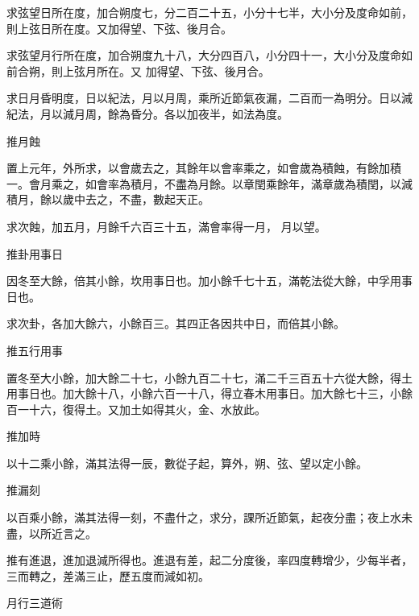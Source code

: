 \begin{pinyinscope}
 求弦望日所在度，加合朔度七，分二百二十五，小分十七半，大小分及度命如前，則上弦日所在度。又加得望、下弦、後月合。



 求弦望月行所在度，加合朔度九十八，大分四百八，小分四十一，大小分及度命如前合朔，則上弦月所在。又
 加得望、下弦、後月合。



 求日月昏明度，日以紀法，月以月周，乘所近節氣夜漏，二百而一為明分。日以減紀法，月以減月周，餘為昏分。各以加夜半，如法為度。



 推月蝕



 置上元年，外所求，以會歲去之，其餘年以會率乘之，如會歲為積蝕，有餘加積一。會月乘之，如會率為積月，不盡為月餘。以章閏乘餘年，滿章歲為積閏，以減積月，餘以歲中去之，不盡，數起天正。



 求次蝕，加五月，月餘千六百三十五，滿會率得一月，
 月以望。



 推卦用事日



 因冬至大餘，倍其小餘，坎用事日也。加小餘千七十五，滿乾法從大餘，中孚用事日也。



 求次卦，各加大餘六，小餘百三。其四正各因共中日，而倍其小餘。



 推五行用事



 置冬至大小餘，加大餘二十七，小餘九百二十七，滿二千三百五十六從大餘，得土用事日也。加大餘十八，小餘六百一十八，得立春木用事日。加大餘七十三，小餘
 百一十六，復得土。又加土如得其火，金、水放此。



 推加時



 以十二乘小餘，滿其法得一辰，數從子起，算外，朔、弦、望以定小餘。



 推漏刻



 以百乘小餘，滿其法得一刻，不盡什之，求分，課所近節氣，起夜分盡；夜上水未盡，以所近言之。



 推有進退，進加退減所得也。進退有差，起二分度後，率四度轉增少，少每半者，三而轉之，差滿三止，歷五度而減如初。



 月行三道術




\end{pinyinscope}
